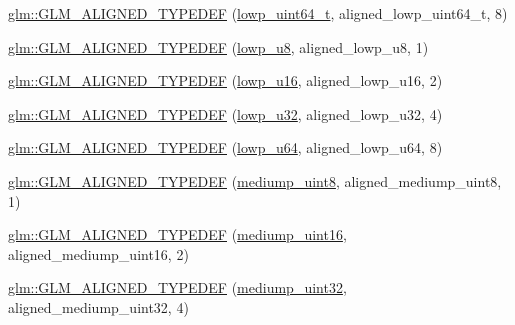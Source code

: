 \begin{DoxyCompactItemize}
\item 
\hyperlink{group__gtx__type__aligned_gaace64bddf51a9def01498da9a94fb01c}{glm\+::\+G\+L\+M\+\_\+\+A\+L\+I\+G\+N\+E\+D\+\_\+\+T\+Y\+P\+E\+D\+EF} (\hyperlink{group__gtc__type__precision_gabf3069d4f188557a87b1d7f35eb0a270}{lowp\+\_\+uint64\+\_\+t}, aligned\+\_\+lowp\+\_\+uint64\+\_\+t, 8)
\item 
\hyperlink{group__gtx__type__aligned_gad7bb97c29d664bd86ffb1bed4abc5534}{glm\+::\+G\+L\+M\+\_\+\+A\+L\+I\+G\+N\+E\+D\+\_\+\+T\+Y\+P\+E\+D\+EF} (\hyperlink{group__gtc__type__precision_gae63f942c49a30dbf266b2f13f3efe257}{lowp\+\_\+u8}, aligned\+\_\+lowp\+\_\+u8, 1)
\item 
\hyperlink{group__gtx__type__aligned_ga404bba7785130e0b1384d695a9450b28}{glm\+::\+G\+L\+M\+\_\+\+A\+L\+I\+G\+N\+E\+D\+\_\+\+T\+Y\+P\+E\+D\+EF} (\hyperlink{group__gtc__type__precision_ga22c5364f27caa0a6eb0627cbc21e46be}{lowp\+\_\+u16}, aligned\+\_\+lowp\+\_\+u16, 2)
\item 
\hyperlink{group__gtx__type__aligned_ga31ba41fd896257536958ec6080203d2a}{glm\+::\+G\+L\+M\+\_\+\+A\+L\+I\+G\+N\+E\+D\+\_\+\+T\+Y\+P\+E\+D\+EF} (\hyperlink{group__gtc__type__precision_gaba06fae1dd98ca50c017e68345df0365}{lowp\+\_\+u32}, aligned\+\_\+lowp\+\_\+u32, 4)
\item 
\hyperlink{group__gtx__type__aligned_gacca5f13627f57b3505676e40a6e43e5e}{glm\+::\+G\+L\+M\+\_\+\+A\+L\+I\+G\+N\+E\+D\+\_\+\+T\+Y\+P\+E\+D\+EF} (\hyperlink{group__gtc__type__precision_ga61ed4c68a4cffb77cd63cc107119123a}{lowp\+\_\+u64}, aligned\+\_\+lowp\+\_\+u64, 8)
\item 
\hyperlink{group__gtx__type__aligned_ga5faf1d3e70bf33174dd7f3d01d5b883b}{glm\+::\+G\+L\+M\+\_\+\+A\+L\+I\+G\+N\+E\+D\+\_\+\+T\+Y\+P\+E\+D\+EF} (\hyperlink{group__gtc__type__precision_gac4b849eaac0543a10f97f4bdda4850a8}{mediump\+\_\+uint8}, aligned\+\_\+mediump\+\_\+uint8, 1)
\item 
\hyperlink{group__gtx__type__aligned_ga727e2bf2c433bb3b0182605860a48363}{glm\+::\+G\+L\+M\+\_\+\+A\+L\+I\+G\+N\+E\+D\+\_\+\+T\+Y\+P\+E\+D\+EF} (\hyperlink{group__gtc__type__precision_ga2cef3a0d7b0fce75c9885f64656d8933}{mediump\+\_\+uint16}, aligned\+\_\+mediump\+\_\+uint16, 2)
\item 
\hyperlink{group__gtx__type__aligned_ga12566ca66d5962dadb4a5eb4c74e891e}{glm\+::\+G\+L\+M\+\_\+\+A\+L\+I\+G\+N\+E\+D\+\_\+\+T\+Y\+P\+E\+D\+EF} (\hyperlink{group__gtc__type__precision_ga861dbd1051f488e425b3966001b568e5}{mediump\+\_\+uint32}, aligned\+\_\+mediump\+\_\+uint32, 4)
\item 

\end{DoxyCompactItemize}
